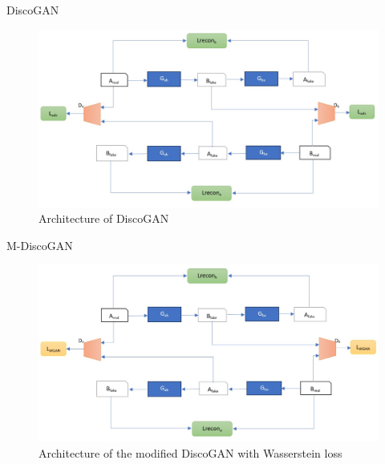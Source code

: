 \documentclass[xcolor=dvipsnames]{beamer}
\begin{document}
\begin{frame}{DiscoGAN}
\begin{figure}
    \centering
    \includegraphics[scale = 0.35]{ppt/img/disco.jpg}
    \caption{Architecture of DiscoGAN}
    \label{fig:enter-label}
\end{figure}
    
\end{frame}



\begin{frame}{M-DiscoGAN}
\begin{figure}
    \centering
    \includegraphics[scale = 0.35]{ppt/img/md.jpg}
    \caption{Architecture of the modified DiscoGAN with Wasserstein loss}
    \label{fig:enter-label}
\end{figure}
\end{frame}
\end{document}
